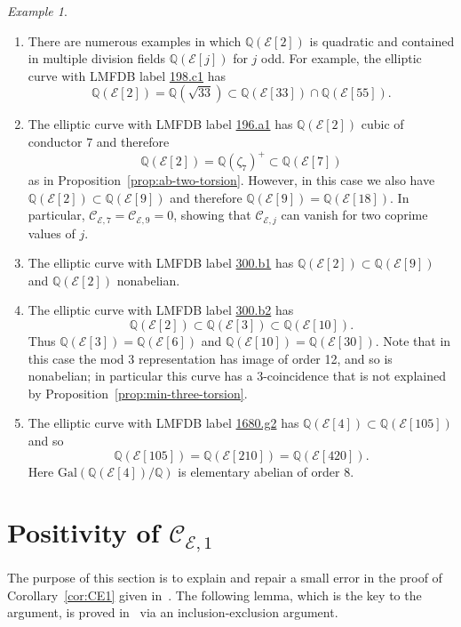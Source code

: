 \documentclass{amsart}
\theoremstyle{plain}
\theoremstyle{remark}
\newtheorem{example}[theorem]{Example}
\newcommand{\Q}{\mathbb{Q}}
\newcommand{\E}{\mathcal{E}}
\newcommand{\Cc}{\mathcal{C}}
\newcommand{\Gal}{\mathrm{Gal}}
\begin{document}
\begin{example}
\begin{enumerate}
    \item There are numerous examples in which $\Q(\E[2])$ is quadratic and contained in multiple division fields
      $\Q(\E[j])$ for $j$ odd. For example, the elliptic curve with LMFDB label
      \href{https://www.lmfdb.org/EllipticCurve/Q/198/c/1}{198.c1} has
    \[\Q(\E[2]) = \Q(\sqrt{33}) \subset \Q(\E[33]) \cap \Q(\E[55]).\]
  \item The elliptic curve with LMFDB label \href{https://www.lmfdb.org/EllipticCurve/Q/196/a/1}{196.a1} has $\Q(\E[2])$
    cubic of conductor 7 and therefore \[\Q(\E[2]) = \Q(\zeta_7)^+ \subset \Q(\E[7])\] as in
    Proposition~\ref{prop:ab-two-torsion}. However, in this case we also have $\Q(\E[2]) \subset \Q(\E[9])$ and
    therefore $\Q(\E[9]) = \Q(\E[18])$. In particular, $\Cc_{\E, 7} = \Cc_{\E, 9} = 0$, showing that $\Cc_{\E,j}$ can
    vanish for two coprime values of $j$.
    \item The elliptic curve with LMFDB label \href{https://www.lmfdb.org/EllipticCurve/Q/300/b/1}{300.b1} has
      $\Q(\E[2]) \subset \Q(\E[9])$ and $\Q(\E[2])$ nonabelian.
    \item  The elliptic curve with LMFDB label \href{https://www.lmfdb.org/EllipticCurve/Q/300/b/2}{300.b2} has 
    \[\Q(\E[2]) \subset \Q(\E[3]) \subset \Q(\E[10]).\]
    Thus $\Q(\E[3]) = \Q(\E[6])$ and $\Q(\E[10])= \Q(\E[30])$. Note that in this case the mod $3$ representation has
    image of order 12, and so is nonabelian; in particular this curve has a $3$-coincidence that is not explained by
    Proposition~\ref{prop:min-three-torsion}.
   \item The elliptic curve with LMFDB label \href{https://www.lmfdb.org/EllipticCurve/Q/1680/g/2}{1680.g2} has 
    $\Q(\E[4]) \subset \Q(\E[105])$
    and so \[\Q(\E[105]) = \Q(\E[210]) = \Q(\E[420]).\] Here $\Gal(\Q(\E[4])/\Q)$ is elementary abelian of order 8. 
    \end{enumerate}
\end{example}


\section{\texorpdfstring{Positivity of $\Cc_{\E,1}$}{Positivity of C(E,1)}}
\label{sec:CoMu}

The purpose of this section is to explain and repair a small error in the proof of Corollary~\ref{cor:CE1} given in~\cite[Section~6]{CoMu}.
The following lemma, which is the key to the argument, is proved in~\cite{CoMu} via an inclusion-exclusion argument.
\end{document}
